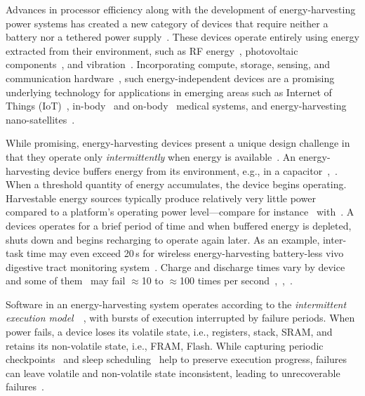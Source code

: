 Advances in processor efficiency along with the development of energy-harvesting power systems has created a new category of devices that require neither a battery nor a tethered power supply~\cite{prasad_comst_2014,lucia_snapl_2017,soyata_csm_2016}. These devices operate entirely using energy extracted from their environment, such as RF energy~\cite{rf_powered_computing_gollakota_2014}, photovoltaic components~\cite{margolies_infocom_2016,margolies_tosn_2016}, and vibration~\cite{gorlatova_sigmetrics_2014}. Incorporating compute, storage, sensing, and communication hardware~\cite{wisp5,moo}, such energy-independent devices are a promising underlying technology for applications in emerging areas such as Internet of Things (IoT)~\cite{ku_cst_2016}, in-body~\cite{nadeau_naturebio_2017} and on-body~\cite{bandodkar_electroanalysis_2015} medical systems, and energy-harvesting nano-satellites~\cite{kicksat}.

While promising, energy-harvesting devices present a unique design challenge in
that they operate only {\em intermittently} when energy is available~\cite{hicks_isca_2017,lucia_snapl_2017}. An
energy-harvesting device buffers energy from its environment, e.g., in a
capacitor~\cite[Fig. 3]{gorlatova_tmc_2013},~\cite[Fig. 1]{gunduz_commag_2014}. When a threshold quantity of energy accumulates, the device begins operating. Harvestable energy sources typically produce relatively very little power compared to a platform's operating power level---compare for instance~\cite[Table III and V]{prasad_comst_2014} with~\cite[Table I]{carrano_cst_2014}. A devices operates for a brief period of time and when buffered energy is depleted, shuts down and begins recharging to operate again later. As an example, inter-task time may even exceed 20\,s for wireless energy-harvesting battery-less vivo digestive tract monitoring system~\cite[Fig. 3c]{nadeau_naturebio_2017}. Charge and discharge times vary by device and some of them~\cite{wisp} may fail $\approx$10 to $\approx$100 times per second~\cite[Fig. 1]{tan_infocom_2016},~\cite[Fig. 1]{mementos},~\cite[Fig. 3]{nvp}.


Software in an energy-harvesting system operates according to the {\em
intermittent execution model}~\cite[Sec. 2]{dino}~\cite[Fig. 2]{lucia_snapl_2017}, with bursts of execution interrupted by failure periods. When power fails, a device loses its volatile state, i.e., registers, stack, SRAM, and retains its non-volatile state, i.e., FRAM, Flash. While capturing periodic checkpoints~\cite{mementos,quickrecall} and sleep scheduling~\cite{dewdrop,hibernus,hibernusplusplus} help to preserve execution progress, failures can leave volatile and non-volatile state inconsistent, leading to unrecoverable failures~\cite{mspcdino,edb}. 

